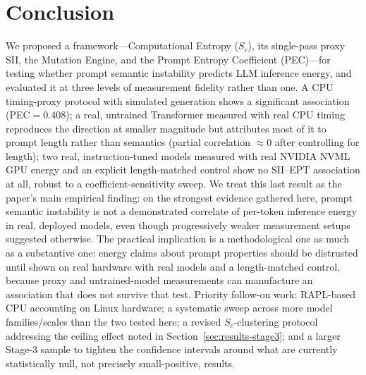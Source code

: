\documentclass[conference]{IEEEtran}
\begin{document}
\section{Conclusion}
We proposed a framework---Computational Entropy ($S_c$), its
single-pass proxy SII, the Mutation Engine, and the Prompt Entropy
Coefficient (PEC)---for testing whether prompt semantic instability
predicts LLM inference energy, and evaluated it at three levels of
measurement fidelity rather than one. A CPU timing-proxy protocol with
simulated generation shows a significant association (PEC$=0.408$); a
real, untrained Transformer measured with real CPU timing reproduces
the direction at smaller magnitude but attributes most of it to prompt
length rather than semantics (partial correlation $\approx0$ after
controlling for length); two real, instruction-tuned models measured
with real NVIDIA NVML GPU energy and an explicit length-matched
control show no SII--EPT association at all, robust to a
coefficient-sensitivity sweep. We treat this last result as the
paper's main empirical finding: on the strongest evidence gathered
here, prompt semantic instability is not a demonstrated correlate of
per-token inference energy in real, deployed models, even though
progressively weaker measurement setups suggested otherwise. The
practical implication is a methodological one as much as a substantive
one: energy claims about prompt properties should be distrusted until
shown on real hardware with real models and a length-matched control,
because proxy and untrained-model measurements can manufacture an
association that does not survive that test. Priority follow-on work:
RAPL-based CPU accounting on Linux hardware; a systematic sweep across
more model families/scales than the two tested here; a revised
$S_c$-clustering protocol addressing the ceiling effect noted in
Section~\ref{sec:results-stage3}; and a larger Stage-3 sample to tighten
the confidence intervals around what are currently statistically null,
not precisely small-positive, results.
\balance
\end{document}
